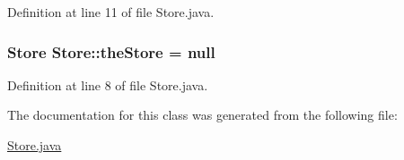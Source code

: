 Definition at line 11 of file Store.java.\hypertarget{classStore_r0}{
\subsubsection[theStore]{\setlength{\rightskip}{0pt plus 5cm}Store Store::the\-Store = null}}
\label{classStore_r0}




Definition at line 8 of file Store.java.

The documentation for this class was generated from the following file:\begin{CompactItemize}
\item 
\hyperlink{Store_8java-source}{Store.java}\end{CompactItemize}
